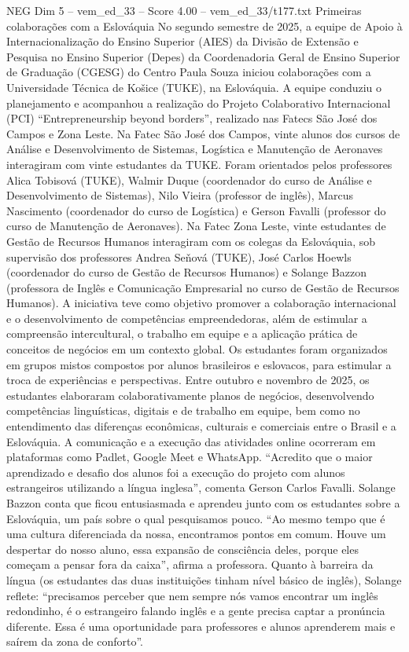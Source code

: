 \begin{textsample}{NEG Dim 5 – vem\_ed\_33 – Score 4.00 – vem\_ed\_33/t177.txt}  \label{ex:f5_neg_072}
Primeiras colaborações com a Eslováquia No segundo semestre de 2025, a equipe de Apoio à Internacionalização do Ensino Superior (AIES) da Divisão de Extensão e Pesquisa no Ensino Superior (Depes) da Coordenadoria Geral de Ensino Superior de Graduação (CGESG) do Centro Paula Souza iniciou colaborações com a Universidade Técnica de Košice (TUKE), na Eslováquia.
A equipe conduziu o planejamento e acompanhou a realização do Projeto Colaborativo Internacional (PCI) “Entrepreneurship beyond borders”, realizado nas Fatecs São José dos Campos e Zona Leste.
Na Fatec São José dos Campos, vinte alunos dos cursos de Análise e Desenvolvimento de Sistemas, Logística e Manutenção de Aeronaves interagiram com vinte estudantes da TUKE.
Foram orientados pelos professores Alica Tobisová (TUKE), Walmir Duque (coordenador do curso de Análise e Desenvolvimento de Sistemas), Nilo Vieira (professor de inglês), Marcus Nascimento (coordenador do curso de Logística) e Gerson Favalli (professor do curso de Manutenção de Aeronaves).
Na Fatec Zona Leste, vinte estudantes de Gestão de Recursos Humanos interagiram com os colegas da Eslováquia, sob supervisão dos professores Andrea Seňová (TUKE), José Carlos Hoewls (coordenador do curso de Gestão de Recursos Humanos) e Solange Bazzon (professora de Inglês e Comunicação Empresarial no curso de Gestão de Recursos Humanos).
A iniciativa teve como objetivo promover a colaboração internacional e o desenvolvimento de competências empreendedoras, além de estimular a compreensão intercultural, o trabalho em equipe e a aplicação prática de conceitos de negócios em um contexto global.
Os estudantes foram organizados em grupos mistos compostos por alunos brasileiros e eslovacos, para estimular a troca de experiências e perspectivas.
Entre outubro e novembro de 2025, os estudantes elaboraram colaborativamente planos de negócios, desenvolvendo competências linguísticas, digitais e de trabalho em equipe, bem como no entendimento das diferenças econômicas, culturais e comerciais entre o Brasil e a Eslováquia.
A comunicação e a execução das atividades online ocorreram em plataformas como Padlet, Google Meet e WhatsApp. “Acredito que o maior aprendizado e desafio dos alunos foi a execução do projeto com alunos estrangeiros utilizando a língua inglesa”, comenta Gerson Carlos Favalli.
Solange Bazzon conta que ficou entusiasmada e aprendeu junto com os estudantes sobre a Eslováquia, um país sobre o qual pesquisamos pouco. “Ao mesmo tempo que é uma cultura diferenciada da nossa, encontramos pontos em comum.
Houve um despertar do nosso aluno, essa expansão de consciência deles, porque eles começam a pensar fora da caixa”, afirma a professora.
Quanto à barreira da língua (os estudantes das duas instituições tinham nível básico de inglês), Solange reflete: “precisamos perceber que nem sempre nós vamos encontrar um inglês redondinho, é o estrangeiro falando inglês e a gente precisa captar a pronúncia diferente.
Essa é uma oportunidade para professores e alunos aprenderem mais e saírem da zona de conforto”.

\end{textsample}
